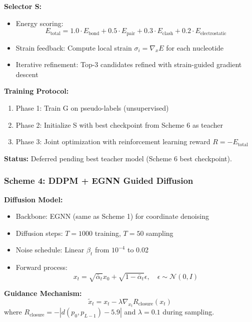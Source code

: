 \documentclass[12pt]{article}
\begin{document}
\textbf{Selector S:}
\begin{itemize}
\item Energy scoring:
\begin{equation}
E_{\text{total}} = 1.0 \cdot E_{\text{bond}} + 0.5 \cdot E_{\text{pair}} + 0.3 \cdot E_{\text{clash}} + 0.2 \cdot E_{\text{electrostatic}}
\end{equation}
\item Strain feedback: Compute local strain $\sigma_i = \nabla_x E$ for each nucleotide
\item Iterative refinement: Top-3 candidates refined with strain-guided gradient descent
\end{itemize}

\textbf{Training Protocol:}
\begin{enumerate}
\item Phase 1: Train G on pseudo-labels (unsupervised)
\item Phase 2: Initialize S with best checkpoint from Scheme 6 as teacher
\item Phase 3: Joint optimization with reinforcement learning reward $R = -E_{\text{total}}$
\end{enumerate}

\textbf{Status:} Deferred pending best teacher model (Scheme 6 best checkpoint).

\subsubsection{Scheme 4: DDPM + EGNN Guided Diffusion}

\textbf{Diffusion Model:}
\begin{itemize}
\item Backbone: EGNN (same as Scheme 1) for coordinate denoising
\item Diffusion steps: $T=1000$ training, $T=50$ sampling
\item Noise schedule: Linear $\beta_t$ from $10^{-4}$ to 0.02
\item Forward process:
\begin{equation}
x_t = \sqrt{\bar{\alpha}_t} x_0 + \sqrt{1-\bar{\alpha}_t} \epsilon, \quad \epsilon \sim \mathcal{N}(0, I)
\end{equation}
\end{itemize}

\textbf{Guidance Mechanism:}
\begin{equation}
\tilde{x}_t = x_t - \lambda \nabla_{x_t} R_{\text{closure}}(x_t)
\end{equation}
where $R_{\text{closure}} = -|d(p_0, p_{L-1}) - 5.9|$ and $\lambda=0.1$ during sampling.
\end{document}
